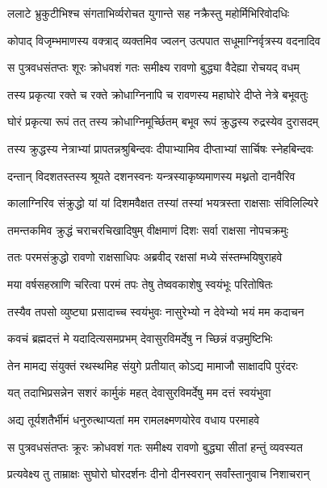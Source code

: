 \twolineshloka
{ललाटे भ्रुकुटीभिश्च संगताभिर्व्यरोचत}
{युगान्ते सह नक्रैस्तु महोर्मिभिरिवोदधिः} %

\twolineshloka
{कोपाद् विजृम्भमाणस्य वक्त्राद् व्यक्तमिव ज्वलन्}
{उत्पपात सधूमाग्निर्वृत्रस्य वदनादिव} %

\twolineshloka
{स पुत्रवधसंतप्तः शूरः क्रोधवशं गतः}
{समीक्ष्य रावणो बुद्ध्या वैदेह्या रोचयद् वधम्} %

\twolineshloka
{तस्य प्रकृत्या रक्ते च रक्ते क्रोधाग्निनापि च}
{रावणस्य महाघोरे दीप्ते नेत्रे बभूवतुः} %

\twolineshloka
{घोरं प्रकृत्या रूपं तत् तस्य क्रोधाग्निमूर्च्छितम्}
{बभूव रूपं क्रुद्धस्य रुद्रस्येव दुरासदम्} %

\twolineshloka
{तस्य क्रुद्धस्य नेत्राभ्यां प्रापतन्नश्रुबिन्दवः}
{दीपाभ्यामिव दीप्ताभ्यां सार्चिषः स्नेहबिन्दवः} %

\twolineshloka
{दन्तान् विदशतस्तस्य श्रूयते दशनस्वनः}
{यन्त्रस्याकृष्यमाणस्य मथ्नतो दानवैरिव} %

\twolineshloka
{कालाग्निरिव संक्रुद्धो यां यां दिशमवैक्षत}
{तस्यां तस्यां भयत्रस्ता राक्षसाः संविलिल्यिरे} %

\twolineshloka
{तमन्तकमिव क्रुद्धं चराचरचिखादिषुम्}
{वीक्षमाणं दिशः सर्वा राक्षसा नोपचक्रमुः} %

\twolineshloka
{ततः परमसंक्रुद्धो रावणो राक्षसाधिपः}
{अब्रवीद् रक्षसां मध्ये संस्तम्भयिषुराहवे} %

\twolineshloka
{मया वर्षसहस्राणि चरित्वा परमं तपः}
{तेषु तेष्ववकाशेषु स्वयंभूः परितोषितः} %

\twolineshloka
{तस्यैव तपसो व्युष्ट्या प्रसादाच्च स्वयंभुवः}
{नासुरेभ्यो न देवेभ्यो भयं मम कदाचन} %

\twolineshloka
{कवचं ब्रह्मदत्तं मे यदादित्यसमप्रभम्}
{देवासुरविमर्देषु न च्छिन्नं वज्रमुष्टिभिः} %

\twolineshloka
{तेन मामद्य संयुक्तं रथस्थमिह संयुगे}
{प्रतीयात् कोऽद्य मामाजौ साक्षादपि पुरंदरः} %

\twolineshloka
{यत् तदाभिप्रसन्नेन सशरं कार्मुकं महत्}
{देवासुरविमर्देषु मम दत्तं स्वयंभुवा} %

\twolineshloka
{अद्य तूर्यशतैर्भीमं धनुरुत्थाप्यतां मम}
{रामलक्ष्मणयोरेव वधाय परमाहवे} %

\twolineshloka
{स पुत्रवधसंतप्तः क्रूरः क्रोधवशं गतः}
{समीक्ष्य रावणो बुद्ध्या सीतां हन्तुं व्यवस्यत} %

\twolineshloka
{प्रत्यवेक्ष्य तु ताम्राक्षः सुघोरो घोरदर्शनः}
{दीनो दीनस्वरान् सर्वांस्तानुवाच निशाचरान्} %

